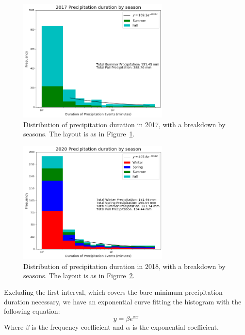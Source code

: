 \documentclass[11pt]{report}
\begin{document}
\clearpage
\begin{figure}[t]
	\centering
	\includegraphics[width=0.675\textwidth]{Figures/precip_2017.png}
	\caption[Precipitation histogram for 2017 broken down by season]{\label{p2017}
		Distribution of precipitation duration in 2017, with a breakdown
		by seasons. The layout is as in Figure~\ref{p2017}.}
\end{figure}
\begin{figure}[b]
	\centering
	\includegraphics[width=0.675\textwidth]{Figures/precip_2020.png}
	\caption[Precipitation histogram for 2020 broken down by season]{\label{p2020}
		Distribution of precipitation duration in 2018, with a breakdown
		by seasons. The layout is as in Figure~\ref{p2020}.}
\end{figure}

\clearpage
Excluding the first interval, which covers the bare minimum precipitation duration necessary, we have an exponential curve fitting the histogram with the following equation: 
\begin{equation}
	y = \beta e^{\alpha x} 
\end{equation}
	Where $\beta$ is the frequency coefficient and $\alpha $ is the exponential coefficient. 
	
\end{document}
